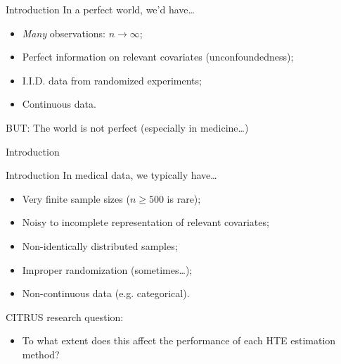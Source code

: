 \documentclass[11pt]{beamer}
\begin{document}
\begin{frame}{Introduction}
In a \alert{perfect} world, we'd have\dots \bigskip

\begin{itemize}\setlength\itemsep{1em}
	\item \textit{Many} observations: $n \to \infty$;
	\item Perfect information on relevant covariates (unconfoundedness);
	\item I.I.D. data from randomized experiments;
	\item Continuous data.
\end{itemize}

\bigskip
BUT: The world is \alert{not} perfect (especially in medicine\dots)
\end{frame}


\begin{frame}{Introduction}
	\begin{figure}
	\end{figure}
\end{frame}


\begin{frame}{Introduction}
In medical data, we typically have\dots \bigskip

\begin{itemize}\setlength\itemsep{1em}
	\item Very finite sample sizes ($n\geq 500$ is rare); 
	\item Noisy to incomplete representation of relevant covariates;
	\item Non-identically distributed samples;
	\item Improper randomization (sometimes\dots);
	\item Non-continuous data (e.g. categorical).
\end{itemize}
\bigskip

\alert{CITRUS research question:}
\begin{itemize}
	\item To what extent does this affect the performance of each HTE estimation method?
\end{itemize}
\end{frame}
\end{document}
